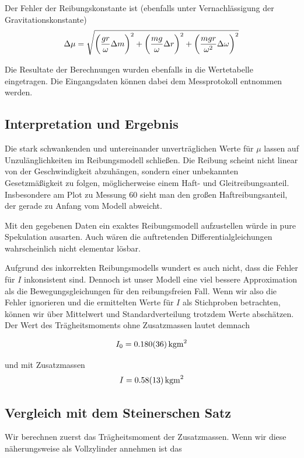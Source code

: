\documentclass[a4paper,german,12pt,smallheadings]{scrartcl}
\begin{document}
Der Fehler der Reibungskonstante ist (ebenfalls unter Vernachlässigung der
Gravitationskonstante)
\begin{equation}
  \Delta \mu = \sqrt{
    \del{\frac{gr}{\omega} \Delta m}^2 +
    \del{\frac{mg}{\omega} \Delta r}^2 +
    \del{\frac{mgr}{\omega^2} \Delta \omega}^2
  }
\end{equation}

Die Resultate der Berechnungen wurden ebenfalls in die Wertetabelle
eingetragen. Die Eingangsdaten können dabei dem Messprotokoll entnommen werden.

\subsection{Interpretation und Ergebnis}
Die stark schwankenden und untereinander unverträglichen Werte für $\mu$ lassen
auf Unzulänglichkeiten im Reibungsmodell schließen. Die Reibung scheint nicht
linear von der Geschwindigkeit abzuhängen, sondern einer unbekannten
Gesetzmäßigkeit zu folgen, möglicherweise einem Haft- und Gleitreibungsanteil.
Insbesondere am Plot zu Messung 60 sieht man den großen Haftreibungsanteil,
der gerade zu Anfang vom Modell abweicht.

Mit den gegebenen Daten ein exaktes Reibungsmodell aufzustellen würde in pure
Spekulation ausarten. Auch wären die auftretenden Differentialgleichungen
wahrscheinlich nicht elementar lösbar.

Aufgrund des inkorrekten Reibungsmodells wundert es auch nicht, dass die Fehler
für $I$ inkonsistent sind. Dennoch ist unser Modell eine viel bessere
Approximation als die Bewegungsgleichungen für den reibungsfreien Fall. Wenn
wir also die Fehler ignorieren und die ermittelten Werte für $I$ als
Stichproben betrachten, können wir über Mittelwert und Standardverteilung
trotzdem Werte abschätzen. Der Wert des Trägheitsmoments ohne Zusatzmassen
lautet demnach

\begin{equation}
  I_0 = \SI{0.180+-0.036}{kg m^2}
\end{equation}

und mit Zusatzmassen
\begin{equation}
  I = \SI{0.58+-0.13}{kg m^2}
\end{equation}

\subsection{Vergleich mit dem Steinerschen Satz}
Wir berechnen zuerst das Trägheitsmoment der Zusatzmassen. Wenn wir diese
näherungsweise als Vollzylinder annehmen ist das
\end{document}
